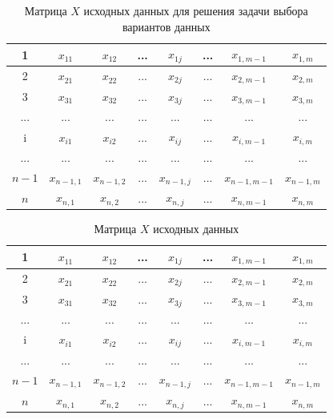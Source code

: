 \documentclass[12pt,a4paper, oneside]{extreport}
\begin{document}
\begin{table}[H]
\caption{Матрица $X$ исходных данных для решения задачи выбора вариантов данных}\label{tab:02:01}
  \centering
\begin{tabular}%
{|c|c|c|c|c|c|c|c|}\hline
1	& $x_{11}$ & $x_{12}$ & ... & $x_{1j}$ & ... & $x_{1,m-1} $ & $x_{1,m}$\\\hline
2	& $x_{21}$ & $x_{22}$ & ... & $x_{2j}$ & ... & $x_{2,m-1} $ & $x_{2,m}$\\\hline
3	& $x_{31}$ & $x_{32}$ & ... & $x_{3j}$ & ... & $x_{3,m-1} $ & $x_{3,m}$\\\hline
...&...&...&...&...&...&...&...\\\hline
i	& $x_{i1}$ & $x_{i2}$ & ... & $x_{ij}$ & ... & $x_{i,m-1} $ & $x_{i,m}$\\\hline
...&...&...&...&...&...&...&...\\\hline
$n-1$	& $x_{n-1,1}$ & $x_{n-1,2}$ & ... & $x_{n-1,j}$ & ... & $x_{n-1,m-1} $ & $x_{n-1,m}$\\\hline
$n$      & $x_{n,1}$ & $x_{n,2}$ & ... & $x_{n,j}$ & ... & $x_{n,m-1} $ & $x_{n,m}$\\\hline
\end{tabular}
\end{table}


\begin{table}[H]
\caption{Матрица $X$ исходных данных}\label{tab:02:01}
  \centering
\begin{tabular}%
{|c|c|c|c|c|c|c|c|}\hline
1	& $x_{11}$ & $x_{12}$ & ... & $x_{1j}$ & ... & $x_{1,m-1} $ & $x_{1,m}$\\\hline
2	& $x_{21}$ & $x_{22}$ & ... & $x_{2j}$ & ... & $x_{2,m-1} $ & $x_{2,m}$\\\hline
3	& $x_{31}$ & $x_{32}$ & ... & $x_{3j}$ & ... & $x_{3,m-1} $ & $x_{3,m}$\\\hline
...&...&...&...&...&...&...&...\\\hline
i	& $x_{i1}$ & $x_{i2}$ & ... & $x_{ij}$ & ... & $x_{i,m-1} $ & $x_{i,m}$\\\hline
...&...&...&...&...&...&...&...\\\hline
$n-1$	& $x_{n-1,1}$ & $x_{n-1,2}$ & ... & $x_{n-1,j}$ & ... & $x_{n-1,m-1} $ & $x_{n-1,m}$\\\hline
$n$      & $x_{n,1}$ & $x_{n,2}$ & ... & $x_{n,j}$ & ... & $x_{n,m-1} $ & $x_{n,m}$\\\hline
\end{tabular}
\end{table}
\end{document}

